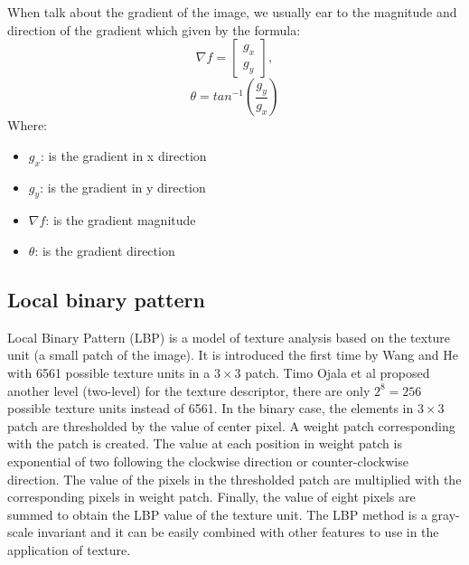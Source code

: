 \documentclass[12pt,a4paper]{article}
\begin{document}
When talk about the gradient of the image, we usually ear to the magnitude and direction of the gradient which given by the formula:
\begin{equation}
	\nabla f = \begin{bmatrix}
					g_x \\
					g_y
				\end{bmatrix},  
\end{equation}
\begin{equation}
	\theta = tan^{-1}(\frac{g_y}{g_x})
\end{equation}
Where: 
\begin{itemize}
	\item $g_x$: is the gradient in x direction
	\item $g_y$: is the gradient in y direction
	\item $\nabla f$: is the gradient magnitude
	\item $\theta$: is the gradient direction
\end{itemize}
\subsection{Local binary pattern}
Local Binary Pattern (LBP) is a model of texture analysis based on the texture unit (a small patch of the image). It is introduced the first time by Wang and He \cite{wang1990texture} with 6561 possible texture units in a $3 \times 3$ patch. Timo Ojala et al \cite{ojala1996comparative} proposed another level (two-level) for the texture descriptor, there are only $2^8 = 256$ possible texture units instead of 6561. In the binary case, the elements in $3 \times 3$ patch are thresholded by the value of center pixel. A weight patch corresponding with the patch is created. The value at each position in weight patch is exponential of two following the clockwise direction or counter-clockwise direction. The value of the pixels in the thresholded patch are multiplied with the corresponding pixels in weight patch. Finally, the value of eight pixels are summed to obtain the LBP value of the texture unit. The LBP method is a gray-scale invariant and it can be easily combined with other features to use in the application of texture.
\end{document}
